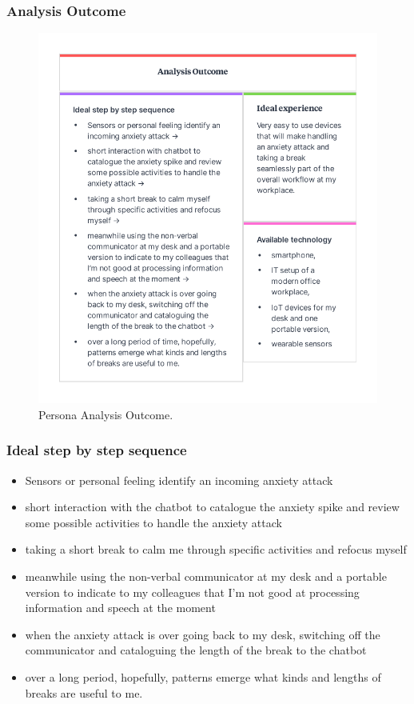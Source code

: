 \subsubsection{Analysis Outcome}\label{Persona Analysis Outcome}
\begin{figure}[hbt!] 
  \centering
  \includegraphics[width=1.04\linewidth]{chap3/image/persona_jans2.pdf}
  \caption[Persona Analysis outcome ]{Persona Analysis Outcome.}
  \label{fig:Persona_Analysis2}
\end{figure}
\subsubsection*{Ideal step by step sequence}
\begin{itemize}
    \item Sensors or personal feeling identify an incoming anxiety attack 
    \item short interaction with the chatbot to catalogue the anxiety spike and review some possible activities to handle the anxiety attack 
    \item taking a short break to calm me through specific activities and refocus myself 
    \item meanwhile using the non-verbal communicator at my desk and a portable version to indicate to my colleagues that I’m not good at processing information and speech at the moment 
    \item when the anxiety attack is over going back to my desk, switching off the communicator and cataloguing the length of the break to the chatbot 
    \item over a long period, hopefully, patterns emerge what kinds and lengths of breaks are useful to me.
\end{itemize}
